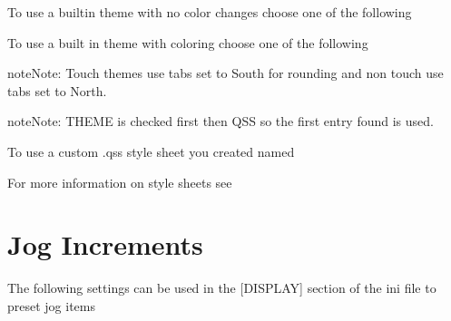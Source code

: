 \documentclass[letterpaper,10pt,english]{sphinxmanual}
\begin{document}
\sphinxAtStartPar
To use a built\sphinxhyphen{}in theme with no color changes choose one of the
following

\begin{sphinxVerbatim}[commandchars=\\\{\}]
  
  
\end{sphinxVerbatim}

\sphinxAtStartPar
To use a built in theme with coloring choose one of the following

\begin{sphinxVerbatim}[commandchars=\\\{\}]
  
  
  
  
\end{sphinxVerbatim}

\begin{sphinxadmonition}{note}{Note:}
\sphinxAtStartPar
Touch themes use tabs set to South for rounding and non touch use tabs
set to North.
\end{sphinxadmonition}

\begin{sphinxadmonition}{note}{Note:}
\sphinxAtStartPar
THEME is checked first then QSS so the first entry found is used.
\end{sphinxadmonition}

\sphinxAtStartPar
To use a custom .qss style sheet you created named 

\begin{sphinxVerbatim}[commandchars=\\\{\}]
  
\end{sphinxVerbatim}

\sphinxAtStartPar
For more information on style sheets see {\hyperref[\detokenize{style::doc}]{}}


\section{Jog Increments}
\label{\detokenize{ini:jog-increments}}
\sphinxAtStartPar
The following settings can be used in the {[}DISPLAY{]} section of the ini file to
preset jog items

\begin{sphinxVerbatim}[commandchars=\\\{\}]
    
         
  
  
  
\end{sphinxVerbatim}
\end{document}
